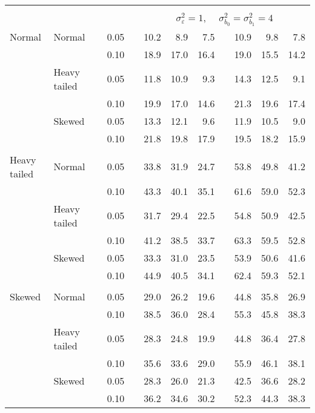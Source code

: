 \begin{table}[ht]
\begin{scriptsize}
\begin{tabular}{ll p{.1cm} c p{.1cm} rrr p{.1cm} rrr}
&&&&&&&&&&&\\
& && && \multicolumn{7}{c}{$\sigma_{\varepsilon}^2 = 1$, \ \ $\sigma_{b_0}^2 = \sigma_{b_1}^2 = 4$} \\ \cline{6-12}
\rowcolor{gray!20}Normal & Normal &  & 0.05 &  & 10.2 & 8.9 & 7.5 &  & 10.9 & 9.8 & 7.8 \\ 
\rowcolor{gray!20}   &  &  & 0.10 &  & 18.9 & 17.0 & 16.4 &  & 19.0 & 15.5 & 14.2 \\ 
\rowcolor{gray!20}   & Heavy tailed &  & 0.05 &  & 11.8 & 10.9 & 9.3 &  & 14.3 & 12.5 & 9.1 \\ 
\rowcolor{gray!20}   &  &  & 0.10 &  & 19.9 & 17.0 & 14.6 &  & 21.3 & 19.6 & 17.4 \\ 
\rowcolor{gray!20}   & Skewed &  & 0.05 &  & 13.3 & 12.1 & 9.6 &  & 11.9 & 10.5 & 9.0 \\ 
\rowcolor{gray!20}   &  &  & 0.10 &  & 21.8 & 19.8 & 17.9 &  & 19.5 & 18.2 & 15.9 \\ 
&&&&&&&&&&&\\
  Heavy tailed & Normal &  & 0.05 &  & 33.8 & 31.9 & 24.7 &  & 53.8 & 49.8 & 41.2 \\ 
   &  &  & 0.10 &  & 43.3 & 40.1 & 35.1 &  & 61.6 & 59.0 & 52.3 \\ 
   & Heavy tailed &  & 0.05 &  & 31.7 & 29.4 & 22.5 &  & 54.8 & 50.9 & 42.5 \\ 
   &  &  & 0.10 &  & 41.2 & 38.5 & 33.7 &  & 63.3 & 59.5 & 52.8 \\ 
   & Skewed &  & 0.05 &  & 33.3 & 31.0 & 23.5 &  & 53.9 & 50.6 & 41.6 \\ 
   &  &  & 0.10 &  & 44.9 & 40.5 & 34.1 &  & 62.4 & 59.3 & 52.1 \\ 
&&&&&&&&&&&\\
  Skewed & Normal &  & 0.05 &  & 29.0 & 26.2 & 19.6 &  & 44.8 & 35.8 & 26.9 \\ 
   &  &  & 0.10 &  & 38.5 & 36.0 & 28.4 &  & 55.3 & 45.8 & 38.3 \\ 
   & Heavy tailed &  & 0.05 &  & 28.3 & 24.8 & 19.9 &  & 44.8 & 36.4 & 27.8 \\ 
   &  &  & 0.10 &  & 35.6 & 33.6 & 29.0 &  & 55.9 & 46.1 & 38.1 \\ 
   & Skewed &  & 0.05 &  & 28.3 & 26.0 & 21.3 &  & 42.5 & 36.6 & 28.2 \\ 
   &  &  & 0.10 &  & 36.2 & 34.6 & 30.2 &  & 52.3 & 44.3 & 38.3 \\ 

\hline
\end{tabular}
\end{scriptsize}
\end{table}


